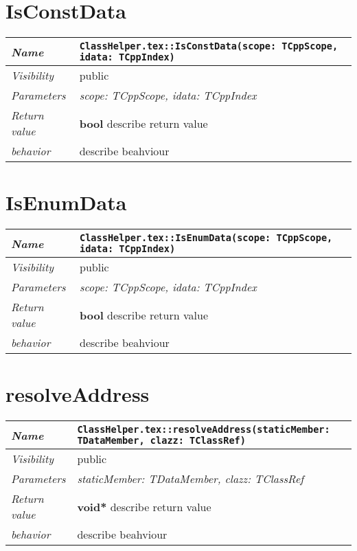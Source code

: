  \section{IsConstData}
\begin{longtable}{p{3cm} @{\hskip 1cm} p{12cm}}
 \hline
\textit{Name} & \texttt{ClassHelper.tex::IsConstData(scope: TCppScope, idata: TCppIndex)}\\
\hline
 \textit{Visibility} & public\\
\hline
\textit{Parameters} & \textit{scope: TCppScope, idata: TCppIndex}\\
\hline
\textit{Return value} & \textbf{ bool} describe return value\\
  \hline
 \textit{behavior} & describe beahviour \\
\hline
\end{longtable} \pagebreak
 \section{IsEnumData}
\begin{longtable}{p{3cm} @{\hskip 1cm} p{12cm}}
 \hline
\textit{Name} & \texttt{ClassHelper.tex::IsEnumData(scope: TCppScope, idata: TCppIndex)}\\
\hline
 \textit{Visibility} & public\\
\hline
\textit{Parameters} & \textit{scope: TCppScope, idata: TCppIndex}\\
\hline
\textit{Return value} & \textbf{ bool} describe return value\\
  \hline
 \textit{behavior} & describe beahviour \\
\hline
\end{longtable} \pagebreak
 \section{resolveAddress}
\begin{longtable}{p{3cm} @{\hskip 1cm} p{12cm}}
 \hline
\textit{Name} & \texttt{ClassHelper.tex::resolveAddress(staticMember: TDataMember, clazz: TClassRef)}\\
\hline
 \textit{Visibility} & public\\
\hline
\textit{Parameters} & \textit{staticMember: TDataMember, clazz: TClassRef}\\
\hline
\textit{Return value} & \textbf{ void*} describe return value\\
  \hline
 \textit{behavior} & describe beahviour \\
\hline
\end{longtable} \pagebreak
